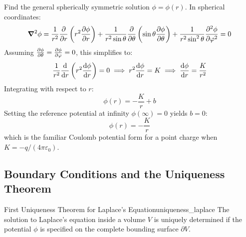 \begin{example}
Find the general spherically symmetric solution $\phi = \phi(r)$. In spherical coordinates:
\begin{equation}
    \grad^2\phi = \frac{1}{r^2}\pdv{r}\left(r^2\pdv{\phi}{r}\right) + \frac{1}{r^2\sin\theta}\pdv{\theta}\left(\sin\theta\pdv{\phi}{\theta}\right) + \frac{1}{r^2\sin^2\theta}\pdv[2]{\phi}{\varphi} = 0
\end{equation}
Assuming $\pdv{\phi}{\theta} = \pdv{\phi}{\varphi} = 0$, this simplifies to:
\begin{equation}
    \frac{1}{r^2}\dv{r}\left(r^2\dv{\phi}{r}\right) = 0 \implies r^2\dv{\phi}{r} = K \implies \dv{\phi}{r} = \frac{K}{r^2}
\end{equation}
Integrating with respect to $r$:
\begin{equation}
    \phi(r) = -\frac{K}{r} + b
\end{equation}
Setting the reference potential at infinity $\phi(\infty) = 0$ yields $b = 0$:
\begin{equation}
    \phi(r) = -\frac{K}{r}
\end{equation}
which is the familiar Coulomb potential form for a point charge when $K = -q/(4\pi\varepsilon_0)$.
\end{example}

\subsection{Boundary Conditions and the Uniqueness Theorem}

\begin{theorem}{First Uniqueness Theorem for Laplace's Equation}{uniqueness_laplace}
The solution to Laplace's equation inside a volume $V$ is uniquely determined if the potential $\phi$ is specified on the complete bounding surface $\partial V$.
\end{theorem}

